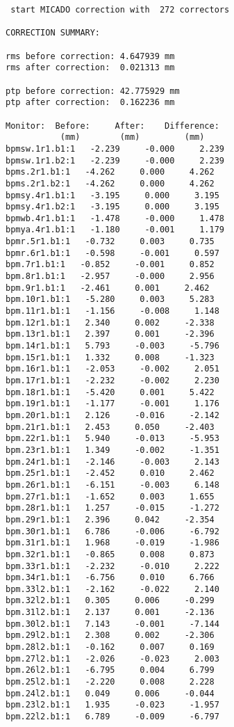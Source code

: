 \begin{verbatim}
 start MICADO correction with  272 correctors
  
CORRECTION SUMMARY:   

rms before correction: 4.647939 mm
rms after correction:  0.021313 mm

ptp before correction: 42.775929 mm
ptp after correction:  0.162236 mm

Monitor:  Before:     After:    Difference:
           (mm)        (mm)         (mm)   
bpmsw.1r1.b1:1   -2.239     -0.000     2.239
bpmsw.1r1.b2:1   -2.239     -0.000     2.239
bpms.2r1.b1:1   -4.262     0.000     4.262
bpms.2r1.b2:1   -4.262     0.000     4.262
bpmsy.4r1.b1:1   -3.195     0.000     3.195
bpmsy.4r1.b2:1   -3.195     0.000     3.195
bpmwb.4r1.b1:1   -1.478     -0.000     1.478
bpmya.4r1.b1:1   -1.180     -0.001     1.179
bpmr.5r1.b1:1   -0.732     0.003     0.735
bpmr.6r1.b1:1   -0.598     -0.001     0.597
bpm.7r1.b1:1   -0.852     -0.001     0.852
bpm.8r1.b1:1   -2.957     -0.000     2.956
bpm.9r1.b1:1   -2.461     0.001     2.462
bpm.10r1.b1:1   -5.280     0.003     5.283
bpm.11r1.b1:1   -1.156     -0.008     1.148
bpm.12r1.b1:1   2.340     0.002     -2.338
bpm.13r1.b1:1   2.397     0.001     -2.396
bpm.14r1.b1:1   5.793     -0.003     -5.796
bpm.15r1.b1:1   1.332     0.008     -1.323
bpm.16r1.b1:1   -2.053     -0.002     2.051
bpm.17r1.b1:1   -2.232     -0.002     2.230
bpm.18r1.b1:1   -5.420     0.001     5.422
bpm.19r1.b1:1   -1.177     -0.001     1.176
bpm.20r1.b1:1   2.126     -0.016     -2.142
bpm.21r1.b1:1   2.453     0.050     -2.403
bpm.22r1.b1:1   5.940     -0.013     -5.953
bpm.23r1.b1:1   1.349     -0.002     -1.351
bpm.24r1.b1:1   -2.146     -0.003     2.143
bpm.25r1.b1:1   -2.452     0.010     2.462
bpm.26r1.b1:1   -6.151     -0.003     6.148
bpm.27r1.b1:1   -1.652     0.003     1.655
bpm.28r1.b1:1   1.257     -0.015     -1.272
bpm.29r1.b1:1   2.396     0.042     -2.354
bpm.30r1.b1:1   6.786     -0.006     -6.792
bpm.31r1.b1:1   1.968     -0.019     -1.986
bpm.32r1.b1:1   -0.865     0.008     0.873
bpm.33r1.b1:1   -2.232     -0.010     2.222
bpm.34r1.b1:1   -6.756     0.010     6.766
bpm.33l2.b1:1   -2.162     -0.022     2.140
bpm.32l2.b1:1   0.305     0.006     -0.299
bpm.31l2.b1:1   2.137     0.001     -2.136
bpm.30l2.b1:1   7.143     -0.001     -7.144
bpm.29l2.b1:1   2.308     0.002     -2.306
bpm.28l2.b1:1   -0.162     0.007     0.169
bpm.27l2.b1:1   -2.026     -0.023     2.003
bpm.26l2.b1:1   -6.795     0.004     6.799
bpm.25l2.b1:1   -2.220     0.008     2.228
bpm.24l2.b1:1   0.049     0.006     -0.044
bpm.23l2.b1:1   1.935     -0.023     -1.957
bpm.22l2.b1:1   6.789     -0.009     -6.797

\end{verbatim}
